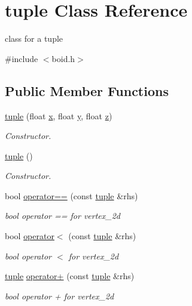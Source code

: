 \hypertarget{classtuple}{}\section{tuple Class Reference}
\label{classtuple}


class for a tuple  




{\ttfamily \#include $<$boid.\+h$>$}

\subsection*{Public Member Functions}
\begin{DoxyCompactItemize}
\item 
\hyperlink{classtuple_aa764946ab904ef453886051dc107e476}{tuple} (float \hyperlink{classtuple_aa2a27c2f1604d90a8d9f8f786238d29a}{x}, float \hyperlink{classtuple_a7ca83d8377715732d23975e01bf317ec}{y}, float \hyperlink{classtuple_a0d96c11f0004c3682fcfdf9672d9b81d}{z})
\begin{DoxyCompactList}\small\item\em Constructor. \end{DoxyCompactList}\item 
\hyperlink{classtuple_ab9871705086ae665b261bfc8b81f73b0}{tuple} ()
\begin{DoxyCompactList}\small\item\em Constructor. \end{DoxyCompactList}\item 
bool \hyperlink{classtuple_ab57f6f6b41927094633d0d27206181a6}{operator==} (const \hyperlink{classtuple}{tuple} \&rhs)
\begin{DoxyCompactList}\small\item\em bool operator == for vertex\+\_\+2d \end{DoxyCompactList}\item 
bool \hyperlink{classtuple_a121aea0bdaa821cbd870e0de3d161fa3}{operator$<$} (const \hyperlink{classtuple}{tuple} \&rhs)
\begin{DoxyCompactList}\small\item\em bool operator $<$ for vertex\+\_\+2d \end{DoxyCompactList}\item 
\hyperlink{classtuple}{tuple} \hyperlink{classtuple_a828ed2b69e93d38f03d986ea39e10ae6}{operator+} (const \hyperlink{classtuple}{tuple} \&rhs)
\begin{DoxyCompactList}\small\item\em bool operator + for vertex\+\_\+2d \end{DoxyCompactList}\item 

\end{DoxyCompactItemize}
